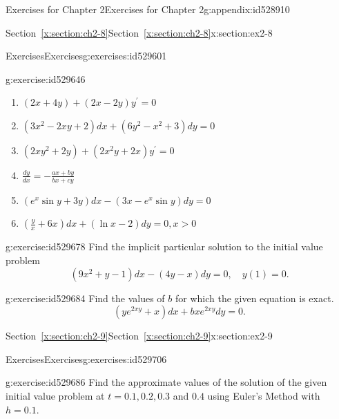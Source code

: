 \documentclass[oneside,10pt,]{book}
\newcommand{\xreffont}{\relax}
\numberwithin{equation}{section}
\numberwithin{equation}{section}
\begin{document}
\begin{appendixptx}{Exercises for Chapter 2}{}{Exercises for Chapter 2}{}{}{g:appendix:id528910}
\begin{sectionptx}{Section~{\xreffont\ref*{x:section:ch2-8}}}{}{Section~{\xreffont\ref*{x:section:ch2-8}}}{}{}{x:section:ex2-8}
\begin{exercises-subsection-numberless}{Exercises}{}{Exercises}{}{}{g:exercises:id529601}
\begin{divisionexercise}{1}{}{}{g:exercise:id529646}
\begin{enumerate}[label=(\alph*)]
\item{}\(\displaystyle \left(2x+4y\right)+\left(2x-2y\right)y^{\prime}=0\)%
\item{}\(\displaystyle \left(3x^{2}-2xy+2\right)dx+\left(6y^{2}-x^{2}+3\right)dy=0\)%
\item{}\(\displaystyle \left(2xy^{2}+2y\right)+\left(2x^{2}y+2x\right)y^{\prime}=0\)%
\item{}\(\displaystyle \frac{dy}{dx}=-\frac{ax+by}{bx+cy}\)%
\item{}\(\displaystyle \left(e^{x}\sin y+3y\right)dx-\left(3x-e^{x}\sin y\right)dy=0\)%
\item{}\(\left(\frac{y}{x}+6x\right)dx+\left(\ln x-2\right)dy=0,\)\(x>0\)%
\end{enumerate}
\end{divisionexercise}%
\begin{divisionexercise}{2}{}{}{g:exercise:id529678}%
Find the implicit particular solution to the initial value problem%
%
\begin{equation*}
\left(9x^{2}+y-1\right)dx-\left(4y-x\right)dy=0,\,\,\,\,\,\,y(1)=0.
\end{equation*}
\end{divisionexercise}%
\begin{divisionexercise}{3}{}{}{g:exercise:id529684}%
Find the values of \(b\) for which the given equation is exact.%
%
\begin{equation*}
\left(ye^{2xy}+x\right)dx+bxe^{2xy}dy=0.
\end{equation*}
\end{divisionexercise}%
\end{exercises-subsection-numberless}
\end{sectionptx}
%
%
\typeout{************************************************}
\typeout{Section C.9 Section~{\xreffont\ref*{x:section:ch2-9}}}
\typeout{************************************************}
%
\begin{sectionptx}{Section~{\xreffont\ref*{x:section:ch2-9}}}{}{Section~{\xreffont\ref*{x:section:ch2-9}}}{}{}{x:section:ex2-9}
%
%
\typeout{************************************************}
\typeout{************************************************}
%
\begin{exercises-subsection-numberless}{Exercises}{}{Exercises}{}{}{g:exercises:id529706}
\begin{divisionexercise}{1}{}{}{g:exercise:id529686}%
Find the approximate values of the solution of the given initial value problem at \(t=0.1,0.2,0.3\) and \(0.4\) using Euler's Method with \(h=0.1\).%

\end{divisionexercise}
\end{exercises-subsection-numberless}
\end{sectionptx}
\end{appendixptx}
\end{document}
